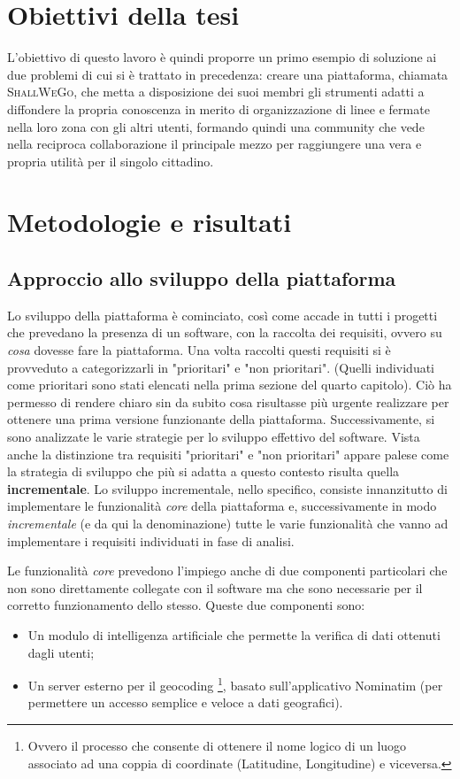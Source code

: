 \section{Obiettivi della tesi}
    L'obiettivo di questo lavoro è quindi proporre un primo esempio di soluzione ai due problemi di cui si è trattato in precedenza: creare una piattaforma, chiamata \textsc{ShallWeGo}, che metta a disposizione dei suoi membri gli strumenti adatti a diffondere la propria conoscenza in merito di organizzazione di linee e fermate nella loro zona con gli altri utenti, formando quindi una community che vede nella reciproca collaborazione il principale mezzo per raggiungere una vera e propria utilità per il singolo cittadino.

    
    
\section{Metodologie e risultati}
    \subsection{Approccio allo sviluppo della piattaforma}
        Lo sviluppo della piattaforma è cominciato, così come accade in tutti i progetti che prevedano la presenza di un software, con la raccolta dei requisiti, ovvero su \textit{cosa} dovesse fare la piattaforma. Una volta raccolti questi requisiti si è provveduto a categorizzarli in "prioritari" e "non prioritari". (Quelli individuati come prioritari sono stati elencati nella prima sezione del quarto capitolo). Ciò ha permesso di rendere chiaro sin da subito cosa risultasse più urgente realizzare per ottenere una prima versione funzionante della piattaforma. 
        Successivamente, si sono analizzate le varie strategie per lo sviluppo effettivo del software. Vista anche la distinzione tra requisiti "prioritari" e "non prioritari" appare palese come la strategia di sviluppo che più si adatta a questo contesto risulta quella \textbf{incrementale}. Lo sviluppo incrementale, nello specifico, consiste innanzitutto di implementare le funzionalità \textit{core} della piattaforma e, successivamente in modo \textit{incrementale} (e da qui la denominazione) tutte le varie funzionalità che vanno ad implementare i requisiti individuati in fase di analisi. 
        
        Le funzionalità \textit{core} prevedono l'impiego anche di due componenti particolari che non sono direttamente collegate con il software ma che sono necessarie per il corretto funzionamento dello stesso. Queste due componenti sono:
        \begin{itemize}
            \item Un modulo di intelligenza artificiale che permette la verifica di dati ottenuti dagli utenti;
            \item Un server esterno per il geocoding \footnote[1]{Ovvero il processo che consente di ottenere il nome logico di un luogo associato ad una coppia di coordinate (Latitudine, Longitudine) e viceversa.}, basato sull'applicativo Nominatim (per permettere un accesso semplice e veloce a dati geografici).
        \end{itemize}

